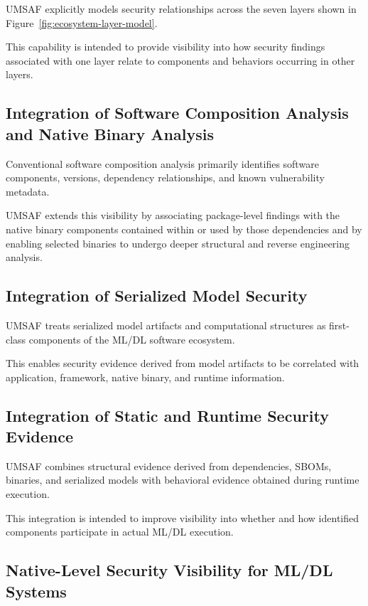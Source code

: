 \documentclass[
  12pt,
  letterpaper,
  oneside]{report}
\begin{document}
UMSAF explicitly models security relationships across the seven layers
shown in Figure~\ref{fig:ecosystem-layer-model}.

This capability is intended to provide visibility into how security
findings associated with one layer relate to components and behaviors
occurring in other layers.

\subsection{Integration of Software Composition Analysis and Native Binary Analysis}\label{1053-integration-of-software-composition-analysis-and-native-binary-analysis}

Conventional software composition analysis primarily identifies software
components, versions, dependency relationships, and known vulnerability
metadata.

UMSAF extends this visibility by associating package-level findings with
the native binary components contained within or used by those
dependencies and by enabling selected binaries to undergo deeper
structural and reverse engineering analysis.

\subsection{Integration of Serialized Model Security}\label{1054-integration-of-serialized-model-security}

UMSAF treats serialized model artifacts and computational structures as
first-class components of the ML/DL software ecosystem.

This enables security evidence derived from model artifacts to be
correlated with application, framework, native binary, and runtime
information.

\subsection{Integration of Static and Runtime Security Evidence}\label{1055-integration-of-static-and-runtime-security-evidence}

UMSAF combines structural evidence derived from dependencies, SBOMs,
binaries, and serialized models with behavioral evidence obtained during
runtime execution.

This integration is intended to improve visibility into whether and how
identified components participate in actual ML/DL execution.

\subsection{Native-Level Security Visibility for ML/DL Systems}\label{1056-native-level-security-visibility-for-mldl-systems}
\end{document}
